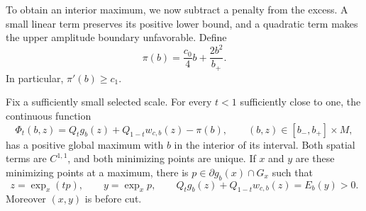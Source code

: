 To obtain an interior maximum, we now subtract a penalty from the
excess. A small linear term preserves its positive lower bound,
and a quadratic term makes the upper amplitude boundary unfavorable.
Define
\begin{equation}
 \pi(b)=\frac{c_0}4b+\frac{2b^2}{b_+}.
 \label{sc:penalty}
\end{equation}
In particular, $\pi'(b)\geq c_1$.

\begin{lemma}\label{sc:maximum}
Fix a sufficiently small selected scale.  For every $t<1$ sufficiently
close to one, the continuous function
\[
 \Phi_t(b,z)=Q_tg_b(z)+Q_{1-t}w_{c,b}(z)-\pi(b),\qquad
 (b,z)\in[b_-,b_+]\times M,
\]
has a positive global maximum with $b$ in the interior of its interval.
Both spatial terms are $C^{1,1}$, and both minimizing points are unique.
If $x$ and $y$ are these minimizing points at a maximum, there is
$p\in\partial g_b(x)\cap G_x$ such that
\begin{equation}
 z=\exp_x(tp),\qquad y=\exp_xp,\qquad
 Q_tg_b(z)+Q_{1-t}w_{c,b}(z)=E_b(y)>0.
 \label{sc:aligned}
\end{equation}
Moreover $(x,y)$ is before cut.
\end{lemma}

